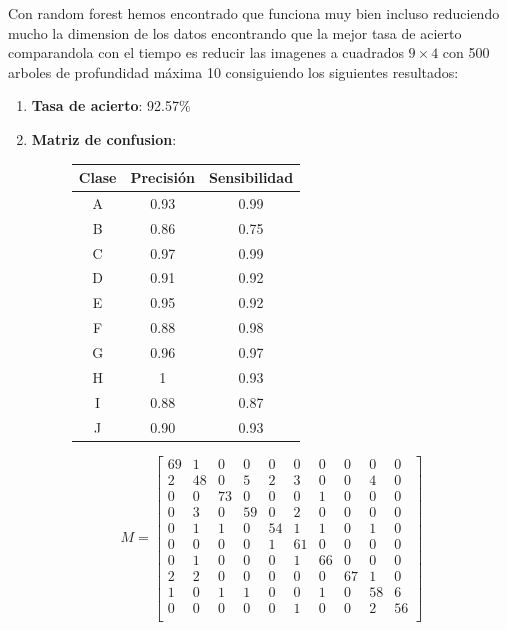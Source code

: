 \documentclass[8pt,a4paper]{article}
\begin{document}
Con random forest hemos encontrado que funciona muy bien incluso reduciendo mucho la dimension de los datos encontrando que la mejor tasa de acierto comparandola con el tiempo es reducir las imagenes a cuadrados $9\times4$ con 500 arboles de profundidad máxima 10 consiguiendo los siguientes resultados:
\begin{enumerate}
\item \textbf{Tasa de acierto}: 92.57$\%$
\item \textbf{Matriz de confusion}:



\begin{figure}[htbp]
\centering
\begin{minipage}{.5\textwidth}
    \begin{tabular}{|c|c|c|} %
    \hline
      \textbf{Clase} & \textbf{Precisión} & \textbf{Sensibilidad}\\
      \hline
      A & 0.93 & 0.99\\
      \hline
      B & 0.86 & 0.75\\
      \hline
      C & 0.97 & 0.99\\
      \hline
      D & 0.91 & 0.92\\
      \hline
      E & 0.95 & 0.92\\
      \hline
      F & 0.88 & 0.98\\
      \hline
      G & 0.96 & 0.97\\
      \hline
      H & 1    & 0.93\\
      \hline
      I & 0.88 & 0.87\\
      \hline
      J & 0.90 & 0.93\\
      \hline
    \end{tabular}
\end{minipage}%
\begin{minipage}{.5\textwidth}
\[
M=
  \begin{bmatrix}
    69 & 1 & 0 & 0 & 0 & 0 & 0 & 0 & 0 & 0 \\
    2 & 48 & 0 & 5 & 2 & 3 & 0 & 0 & 4 & 0 \\
    0 & 0 & 73 & 0 & 0 & 0 & 1 & 0 & 0 & 0 \\
    0 & 3 & 0 & 59 & 0 & 2 & 0 & 0 & 0 & 0 \\
    0 & 1 & 1 & 0 & 54 & 1 & 1 & 0 & 1 & 0 \\
    0 & 0 & 0 & 0 & 1 & 61 & 0 & 0 & 0 & 0 \\
    0 & 1 & 0 & 0 & 0 & 1 & 66 & 0 & 0 & 0 \\
    2 & 2 & 0 & 0 & 0 & 0 & 0 & 67 & 1 & 0 \\
    1 & 0 & 1 & 1 & 0 & 0 & 1 & 0 & 58 & 6 \\
    0 & 0 & 0 & 0 & 0 & 1 & 0 & 0 & 2 & 56 \\
  \end{bmatrix}
\]
\end{minipage}
\end{figure}


\end{enumerate}
\end{document}

